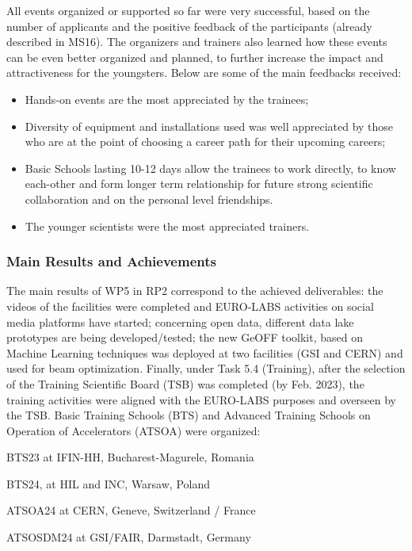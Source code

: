 All events organized or supported so far were very successful, based on the number of applicants and the positive feedback of the participants (already described in MS16). The organizers and trainers also learned
how these events can be even better organized and planned, to further increase the impact and attractiveness for the youngsters.
Below are some of the main feedbacks received:
\begin{itemize}
\item Hands-on events are the most appreciated by the trainees;
\item Diversity of equipment and installations used was well appreciated by those who are at the point of choosing a career path for their upcoming careers;
\item Basic Schools lasting 10-12 days allow the trainees to work directly, to know each-other 
and form longer term relationship for future strong scientific collaboration and on the personal level friendships.
\item The younger scientists were the most appreciated trainers.
\end{itemize}

\subsubsection*{Main Results and Achievements}

The main results of WP5 in RP2 correspond to the achieved deliverables: the videos of the facilities were completed and EURO-LABS activities on social media platforms have started; concerning open data, different data lake prototypes are being developed/tested; 
the new GeOFF toolkit, based on Machine Learning techniques was deployed at two facilities (GSI and CERN) and used for beam optimization. Finally, under Task 5.4 (Training), after the selection of the Training Scientific Board (TSB) was completed (by Feb. 2023), the training  activities were aligned with the EURO-LABS purposes %
and overseen by the TSB. Basic Training Schools (BTS) and Advanced Training Schools on Operation of Accelerators (ATSOA) were organized:

BTS23 at IFIN-HH, Bucharest-Magurele, Romania

BTS24, at HIL and INC, Warsaw, Poland

ATSOA24 at CERN, Geneve, Switzerland / France

ATSOSDM24 at GSI/FAIR, Darmstadt, Germany

